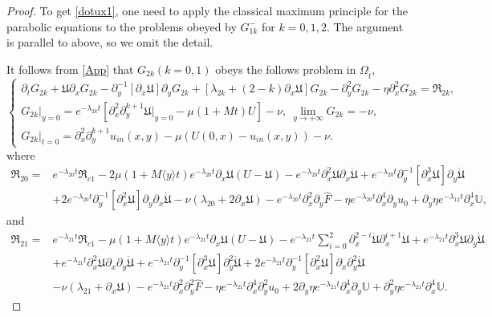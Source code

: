 \documentclass{amsart}
\numberwithin{equation}{section}
\newcommand\y{{{\langle y \rangle}}}
\begin{document}
\begin{proof}
To get \eqref{dotux1}, one need to apply the classical maximum principle for the parabolic equations to the problems obeyed by $G_{1k}^{-}$ for $k=0,1,2$. The argument is parallel to above, so we omit the detail.

It follows from \eqref{App} that $G_{2k}(k=0,1)$ obeys the follows problem in $\Omega_{\hat{t}}$,
\begin{equation*}
\begin{cases}
\partial_{t}G_{2k}
+\mathfrak{U}\partial_{x}G_{2k}
-\partial_{y}^{-1}[\partial_{x}\mathfrak{U}]\partial_{y}G_{2k}
+[\lambda_{2k}+(2-k)\partial_{x}\mathfrak{U}]G_{2k}
-\partial_{y}^{2}G_{2k}
-\eta\partial_{x}^{2}G_{2k}
=\mathfrak{R}_{2k},\\
G_{2k}|_{y=0}=e^{-\lambda_{2k}t}\left[\partial_{x}^{2}\partial_{y}^{k+1}\mathfrak{U}|_{y=0}-\mu(1+Mt)U\right]-\nu,~
\lim\limits_{y\to+\infty}G_{2k}=-\nu,\\
G_{2k}|_{t=0}=\partial_{x}^{2}\partial_{y}^{k+1}u_{in}(x,y)-\mu(U(0,x)-u_{in}(x,y))-\nu.
\end{cases}
\end{equation*}
where
\begin{align*}
\mathfrak{R}_{20}
=& e^{-\lambda_{20}t}\mathfrak{R}_{c1}
  -2\mu(1+M\y t)e^{-\lambda_{20}t}\partial_{x}\mathfrak{U}(U-\mathfrak{U})
  -e^{-\lambda_{20}t}\partial_{x}^{2}\mathfrak{U}\partial_{x}\dot{\mathfrak{U}}
  +e^{-\lambda_{20}t}\partial_{y}^{-1}[\partial_{x}^{3}\mathfrak{U}]\partial_{y}\dot{\mathfrak{U}}\\
 &+2e^{-\lambda_{20}t}\partial_{y}^{-1}[\partial_{x}^{2}\mathfrak{U}]\partial_{y}\partial_{x}\dot{\mathfrak{U}}
  -\nu(\lambda_{20}+2\partial_{x}\mathfrak{U})
  -e^{-\lambda_{20}t}\partial_{x}^{2}\partial_{y}\hat{F}
  -\eta e^{-\lambda_{20}t}\partial_{x}^{4}\partial_{y}u_{0}
  +\partial_{y}\eta e^{-\lambda_{12}t}\partial_{x}^{4}\mathbb{U},
\end{align*}
and
\begin{align*}
\mathfrak{R}_{21}
=& e^{-\lambda_{21}t}\mathfrak{R}_{c1}
  -\mu(1+M\y t)e^{-\lambda_{21}t}\partial_{x}\mathfrak{U}(U-\mathfrak{U})
  -e^{-\lambda_{21}t}\sum_{i=0}^{2}\partial_{x}^{2-i}\dot{\mathfrak{U}}\partial_{x}^{i+1}\dot{\mathfrak{U}}
  +e^{-\lambda_{21}t}\partial_{x}^{3}\mathfrak{U}\partial_{y}\dot{\mathfrak{U}}\\
 &+e^{-\lambda_{21}t}\partial_{x}^{2}\mathfrak{U}\partial_{x}\partial_{y}\dot{\mathfrak{U}}
  +e^{-\lambda_{21}t}\partial_{y}^{-1}[\partial_{x}^{3}\mathfrak{U}]\partial_{y}^{2}\dot{\mathfrak{U}}
  +2e^{-\lambda_{21}t}\partial_{y}^{-1}[\partial_{x}^{2}\mathfrak{U}]\partial_{x}\partial_{y}^{2}\dot{\mathfrak{U}}\\
 &-\nu(\lambda_{21}+\partial_{x}\mathfrak{U})
  -e^{-\lambda_{21}t}\partial_{x}^{2}\partial_{y}^{2}\hat{F}
  -\eta e^{-\lambda_{21}t}\partial_{x}^{4}\partial_{y}^{2}u_{0}
  +2\partial_{y}\eta e^{-\lambda_{21}t}\partial_{x}^{4}\partial_{y}\mathbb{U}
  +\partial_{y}^{2}\eta e^{-\lambda_{21}t}\partial_{x}^{4}\mathbb{U}.
\end{align*}


\end{proof}
\end{document}
